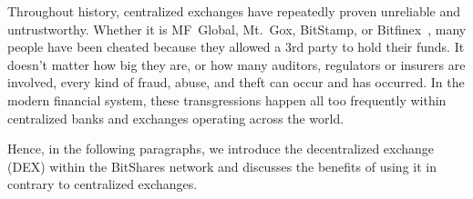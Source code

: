 \label{sec:dex}

Throughout history, centralized exchanges have repeatedly proven unreliable and
untrustworthy. Whether it is MF~Global, Mt.~Gox, BitStamp, or
Bitfinex~\cite{mfglobal,mtgox,bitstamp,bitfinex}, many people have been cheated
because they allowed a 3rd party to hold their funds. It doesn't matter how big
they are, or how many auditors, regulators or insurers are involved, every kind
of fraud, abuse, and theft can occur and has occurred. In the modern financial
system, these transgressions happen all too frequently within centralized banks
and exchanges operating across the world.

Hence, in the following paragraphs, we introduce the decentralized exchange
(DEX) within the BitShares network and discusses the benefits of using it in
contrary to centralized exchanges.
